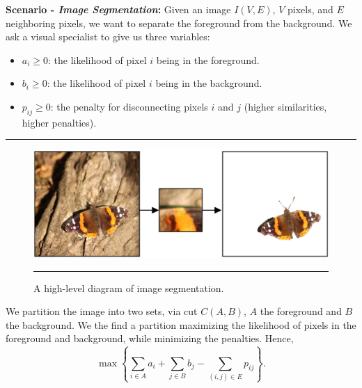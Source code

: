 \newpage 

\newpage
\noindent
\textbf{Scenario - \textit{Image Segmentation}:} Given an image $I(V,E)$, $V$ pixels, and $E$ neighboring pixels, we want to
separate the foreground from the background. We ask a visual specialist to give us three variables: 

\begin{itemize}
    \item $a_i\geq 0$: the likelihood of pixel $i$ being in the foreground.
    \item $b_i \geq 0$: the likelihood of pixel $i$ being in the background.
    \item $p_{ij} \geq 0$: the penalty for disconnecting pixels $i$ and $j$ (higher similarities, higher penalties).
\end{itemize}

\vspace{-1em}
\noindent\rule{\textwidth}{0.4pt}

\begin{figure}[h]
    \centering
    \includegraphics[width=.7\textwidth]{Sections/net/butterfly.png}
    \noindent\rule{\textwidth}{0.4pt}
    \caption{A high-level diagram of image segmentation.}
    \label{fig:butterfly}
\end{figure}

\noindent
We partition the image into two sets, via cut $C(A,B)$, $A$ the foreground and $B$ the background.
We the find a partition maximizing the likelihood of pixels in the foreground and background, while minimizing the penalties.
Hence, 
$$\displaystyle\max\left\{\sum_{i\in A} a_i + \sum_{j\in B} b_j - \sum_{(i,j)\in E} p_{ij}\right\}.$$

